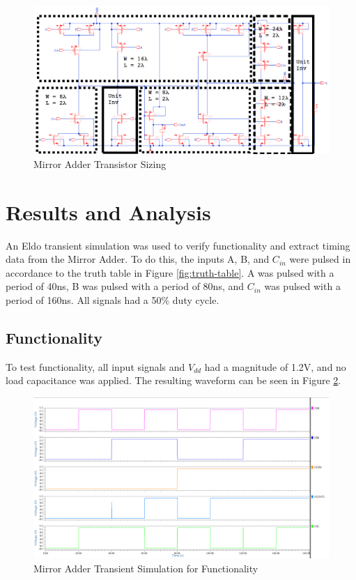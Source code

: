 \documentclass[11pt]{article}
\begin{document}
		\begin{figure}[H]
			\centering
			\includegraphics[width=0.9\linewidth]{"Pictures/Mirror Adder Schematic Sizing"}
			\caption{Mirror Adder Transistor Sizing}
			\label{fig:mirror-adder-schematic-sizing}
		\end{figure}
	
		

\section{Results and Analysis}

	An Eldo transient simulation was used to verify functionality and extract timing data from the Mirror Adder. To do this, the inputs A, B, and $C_{in}$ were pulsed in accordance to the truth table in Figure \ref{fig:truth-table}. A was pulsed with a period of 40ns, B was pulsed with a period of 80ns, and $C_{in}$ was pulsed with a period of 160ns. All signals had a 50\% duty cycle.

	\subsection{Functionality}
	
		To test functionality, all input signals and $V_{dd}$ had a magnitude of 1.2V, and no load capacitance was applied. The resulting waveform can be seen in Figure \ref{fig:mirror-adder-functional-sim}.
	
		
		\begin{figure}[H]
			\centering
			\includegraphics[width=0.9\linewidth]{"Pictures/Mirror Adder Functional Sim"}
			\caption{Mirror Adder Transient Simulation for Functionality}
			\label{fig:mirror-adder-functional-sim}
		\end{figure}
	
\end{document}
